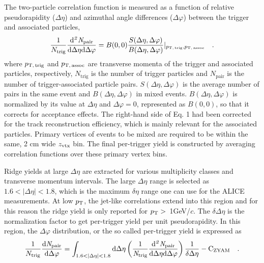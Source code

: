 The two-particle correlation function is measured as a function of relative pseudorapidity ($\Delta\eta$) and azimuthal angle differences ($\Delta\varphi$) between the trigger and associated particles,
\begin{eqnarray}
\frac{1}{N_{\rm{trig}}} \frac{ \rm{d}\it{}^{2} N_{\rm{pair}} }{ \rm{d} \Delta\eta \rm{d}\Delta\varphi} = B(0, 0)\frac{S(\Delta\eta, \Delta\varphi)}{B(\Delta\eta, \Delta\varphi)}  \lvert_{p_\mathrm{T,\,trig},p_\mathrm{T,\,assoc}}  \quad.
\label{eq:corrfunction}
\end{eqnarray}
where $p_\mathrm{T,\,trig}$ and $p_\mathrm{T,\,assoc}$ are transverse momenta of the trigger and associated particles, respectively, $N_\mathrm{trig}$ is the number of trigger particles and $N_\mathrm{pair}$ is the number of trigger-associated particle pairs. 
$S (\Delta\eta, \Delta\varphi)$ is the average number of pairs in the same event and $B(\Delta\eta, \Delta\varphi)$ in mixed events. $B(\Delta\eta, \Delta\varphi)$ is normalized by its value at $\Delta\eta$ and $\Delta\varphi = 0$, represented as $B (0,0)$, so that it corrects for acceptance effects. The right-hand side of Eq. 1 had been corrected for the track reconstruction efficiency, which is mainly relevant for the associated particles. Primary vertices of events to be mixed are required to be within the same, 2 cm wide $z_{\rm{vtx}}$ bin. The final per-trigger yield is constructed by averaging correlation functions over these primary vertex bins.

Ridge yields at large $\Delta\eta$ are extracted for various multiplicity classes and transverse momentum intervals. The large $\Delta\eta$ range is selected as $1.6<|\Delta\eta|<1.8$,  which is the maximum $\delta\eta$ range one can use for the ALICE measurements. At low $p_\mathrm{T}$, the jet-like correlations extend into this region and for this reason the ridge yield is only reported for $p_\mathrm{T}>$~1GeV/$c$. The $\delta\Delta\eta$ is the normalization factor to get per-trigger yield per unit pseudorapidity. In this region, the $\Delta\varphi$ distribution, or the so called per-trigger yield is expressed as
\begin{eqnarray}
\frac{1}{N_{\rm{trig}}} \frac{ \rm{d}\it{}N_{\rm{pair}} }{ \rm{d}\Delta\varphi } = \int_{1.6<|\Delta \eta|<1.8} \rm{d} \Delta \eta \left( \frac{1}{\it{N}_{\rm{trig}}} \frac{ \rm{d}\it{}^{2} N_{\rm{pair}} }{ \rm{d}\Delta\eta d\Delta\varphi} \right) \dfrac{1}{\delta\Delta\eta} - C_{\rm{ZYAM}} \quad.
\end{eqnarray}

